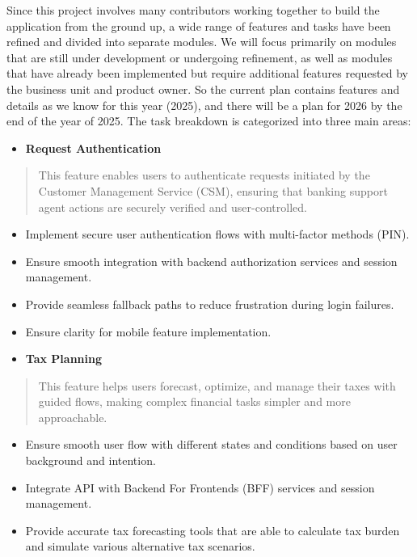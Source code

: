 Since this project involves many contributors working together to build
the application from the ground up, a wide range of features and tasks
have been refined and divided into separate modules. We will focus
primarily on modules that are still under development or undergoing
refinement, as well as modules that have already been implemented but
require additional features requested by the business unit and product
owner. So the current plan contains features and details as we know for
this year (2025), and there will be a plan for 2026 by the end of the
year of 2025. The task breakdown is categorized into three main areas:

\begin{itemize}
\item
  \textbf{Request Authentication}
\end{itemize}

\begin{quote}
This feature enables users to authenticate requests initiated by the
Customer Management Service (CSM), ensuring that banking support agent
actions are securely verified and user-controlled.
\end{quote}

\begin{itemize}
\item
  Implement secure user authentication flows with multi-factor methods
  (PIN).
\item
  Ensure smooth integration with backend authorization services and
  session management.
\item
  Provide seamless fallback paths to reduce frustration during login
  failures.
\item
  Ensure clarity for mobile feature implementation.
\end{itemize}

\begin{itemize}
\item
  \textbf{Tax Planning}
\end{itemize}

\begin{quote}
This feature helps users forecast, optimize, and manage their taxes with
guided flows, making complex financial tasks simpler and more
approachable.
\end{quote}

\begin{itemize}
\item
  Ensure smooth user flow with different states and conditions based on
  user background and intention.
\item
  Integrate API with Backend For Frontends (BFF) services and session
  management.
\item
  Provide accurate tax forecasting tools that are able to calculate tax
  burden and simulate various alternative tax scenarios.
\end{itemize}

